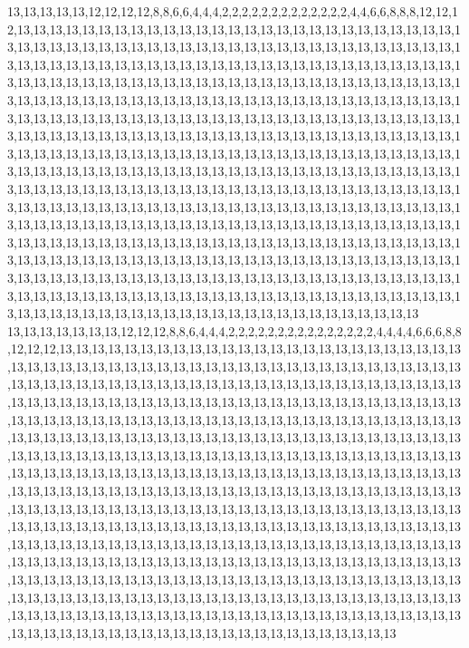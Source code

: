 13,13,13,13,13,12,12,12,12,8,8,6,6,4,4,4,2,2,2,2,2,2,2,2,2,2,2,2,2,4,4,6,6,8,8,8,12,12,12,13,13,13,13,13,13,13,13,13,13,13,13,13,13,13,13,13,13,13,13,13,13,13,13,13,13,13,13,13,13,13,13,13,13,13,13,13,13,13,13,13,13,13,13,13,13,13,13,13,13,13,13,13,13,13,13,13,13,13,13,13,13,13,13,13,13,13,13,13,13,13,13,13,13,13,13,13,13,13,13,13,13,13,13,13,13,13,13,13,13,13,13,13,13,13,13,13,13,13,13,13,13,13,13,13,13,13,13,13,13,13,13,13,13,13,13,13,13,13,13,13,13,13,13,13,13,13,13,13,13,13,13,13,13,13,13,13,13,13,13,13,13,13,13,13,13,13,13,13,13,13,13,13,13,13,13,13,13,13,13,13,13,13,13,13,13,13,13,13,13,13,13,13,13,13,13,13,13,13,13,13,13,13,13,13,13,13,13,13,13,13,13,13,13,13,13,13,13,13,13,13,13,13,13,13,13,13,13,13,13,13,13,13,13,13,13,13,13,13,13,13,13,13,13,13,13,13,13,13,13,13,13,13,13,13,13,13,13,13,13,13,13,13,13,13,13,13,13,13,13,13,13,13,13,13,13,13,13,13,13,13,13,13,13,13,13,13,13,13,13,13,13,13,13,13,13,13,13,13,13,13,13,13,13,13,13,13,13,13,13,13,13,13,13,13,13,13,13,13,13,13,13,13,13,13,13,13,13,13,13,13,13,13,13,13,13,13,13,13,13,13,13,13,13,13,13,13,13,13,13,13,13,13,13,13,13,13,13,13,13,13,13,13,13,13,13,13,13,13,13,13,13,13,13,13,13,13,13,13,13,13,13,13,13,13,13,13,13,13,13,13,13,13,13,13,13,13,13,13,13,13,13,13,13,13,13,13,13,13,13,13,13,13,13,13,13,13,13,13,13,13,13,13,13,13,13,13,13,13,13,13,13,13,13,13,13,13,13,13,13,13,13,13,13,13,13,13,13,13,13,13,13,13,13,13,13,13,13,13,13,13,13,13,13,13,13,13,13,13,13,13,13,13,13,13,13,13,13,13,13,13,13,13,13,13,13,13,13,13,13,13,13,13
13,13,13,13,13,13,13,12,12,12,8,8,6,4,4,4,2,2,2,2,2,2,2,2,2,2,2,2,2,2,2,4,4,4,4,6,6,6,8,8,12,12,12,13,13,13,13,13,13,13,13,13,13,13,13,13,13,13,13,13,13,13,13,13,13,13,13,13,13,13,13,13,13,13,13,13,13,13,13,13,13,13,13,13,13,13,13,13,13,13,13,13,13,13,13,13,13,13,13,13,13,13,13,13,13,13,13,13,13,13,13,13,13,13,13,13,13,13,13,13,13,13,13,13,13,13,13,13,13,13,13,13,13,13,13,13,13,13,13,13,13,13,13,13,13,13,13,13,13,13,13,13,13,13,13,13,13,13,13,13,13,13,13,13,13,13,13,13,13,13,13,13,13,13,13,13,13,13,13,13,13,13,13,13,13,13,13,13,13,13,13,13,13,13,13,13,13,13,13,13,13,13,13,13,13,13,13,13,13,13,13,13,13,13,13,13,13,13,13,13,13,13,13,13,13,13,13,13,13,13,13,13,13,13,13,13,13,13,13,13,13,13,13,13,13,13,13,13,13,13,13,13,13,13,13,13,13,13,13,13,13,13,13,13,13,13,13,13,13,13,13,13,13,13,13,13,13,13,13,13,13,13,13,13,13,13,13,13,13,13,13,13,13,13,13,13,13,13,13,13,13,13,13,13,13,13,13,13,13,13,13,13,13,13,13,13,13,13,13,13,13,13,13,13,13,13,13,13,13,13,13,13,13,13,13,13,13,13,13,13,13,13,13,13,13,13,13,13,13,13,13,13,13,13,13,13,13,13,13,13,13,13,13,13,13,13,13,13,13,13,13,13,13,13,13,13,13,13,13,13,13,13,13,13,13,13,13,13,13,13,13,13,13,13,13,13,13,13,13,13,13,13,13,13,13,13,13,13,13,13,13,13,13,13,13,13,13,13,13,13,13,13,13,13,13,13,13,13,13,13,13,13,13,13,13,13,13,13,13,13,13,13,13,13,13,13,13,13,13,13,13,13,13,13,13,13,13,13,13,13,13,13,13,13,13,13,13,13,13,13,13,13,13,13,13,13,13,13,13,13,13,13,13,13,13,13,13,13,13,13,13,13,13,13,13,13,13,13,13,13,13,13,13,13,13,13,13,13,13,13,13,13
